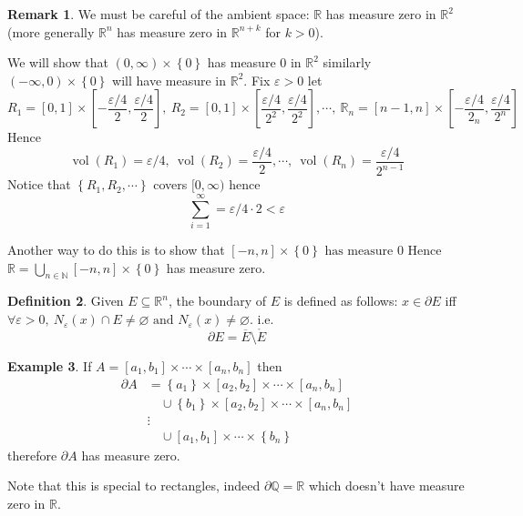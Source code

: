 \documentclass[11pt,a4paper]{article}
\theoremstyle{definition}
\newtheorem{definition}{Definition}[section]
\newtheorem{example}[definition]{Example}
\newtheorem{remark}[definition]{Remark}
\theoremstyle{plain}
\theoremstyle{remark}
\newcommand{\R}{\mathbb{R}}
\newcommand{\N}{\mathbb{N}}
\newcommand{\Q}{\mathbb{Q}}
\renewcommand{\set}[1]{\left\{ #1 \right\}}
\newcommand{\vol}{\operatorname{vol}}
\begin{document}
\begin{remark}
    We must be careful of the ambient space: $\R$ has measure zero in $\R^2$ (more generally $\R^n$ has measure zero in 
    $\R^{n+k}$ for $k > 0$). 

    We will show that $(0, \infty) \times \set{0}$ has measure $0$ in $\R^2$ similarly $(-\infty, 0) \times \set{0}$ will 
    have measure in $\R^2$. Fix $\varepsilon > 0$ let 
    $$R_1 = [0,1] \times [-\frac{\varepsilon/4}{2}, \frac{\varepsilon/4}{2}], \ R_2 = [0,1] \times [\frac{\varepsilon/4}{2^2}, \frac{\varepsilon/4}{2^2}], \cdots, \ \R_n = [n-1, n] \times [-\frac{\varepsilon/4}{2_n}, \frac{\varepsilon/4}{2^n}]$$
    Hence 
    $$\vol (R_1) = \varepsilon/4, \ \vol (R_2) = \frac{\varepsilon/4}{2}, \cdots, \ \vol (R_n) = \frac{\varepsilon/4}{2^{n-1}}$$
    Notice that $\set{R_1, R_2, \cdots}$ covers $[0, \infty)$ hence 
    $$\sum_{i=1}^\infty = \varepsilon/4 \cdot 2 < \varepsilon$$

    Another way to do this is to show that $[-n, n] \times \set{0} \text{ has measure $0$}$ 
    Hence $\R = \bigcup_{n \in \N} [-n,n] \times \set{0}$ has measure zero.  
\end{remark}

\begin{definition}
    Given $E \subseteq \R^n$, the boundary of $E$ is defined as follows: $x \in \partial E$ iff 
    $\forall \varepsilon > 0, \ N_\varepsilon(x) \cap E \ne \varnothing \text{ and } N_\varepsilon(x) \ne \varnothing$. 
    i.e. 
    $$\partial E = \overline{E} \setminus \mathring{E}$$ 
\end{definition}

\begin{example}
    If $A = [a_1, b_1] \times \cdots \times [a_n , b_n]$ then 
    \begin{align*}
        \partial A &= \set{a_1} \times [a_2, b_2] \times \cdots \times [a_n, b_n] \\
        &\quad \cup \set{b_1} \times [a_2, b_2] \times \cdots \times [a_n, b_n] \\
        &\vdots \\
        &\quad \cup [a_1, b_1] \times \cdots \times \set{b_n} 
    \end{align*}
    therefore $\partial A$ has measure zero. 

    Note that this is special to rectangles, indeed $\partial \Q = \R$ which doesn't have measure zero in $\R$.
\end{example}
\end{document}
